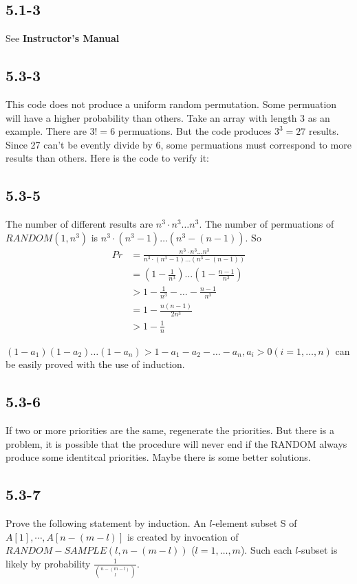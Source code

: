 \documentclass{book}
\begin{document}
\begin{CJK}{UTF8}{gkai}
\subsection*{5.1-3}
See \textbf{Instructor's Manual}

\subsection*{5.3-3}
This code does not produce a uniform random permutation. Some permuation will 
have a higher probability than others. Take an array with length 3 as an 
example. There are $3!=6$ permuations. But the code produces $3^3 = 27$ results.  
Since 27 can't be evently divide by 6, some permuations must correspond to more 
results than others. Here is the code to verify it:
%

\subsection*{5.3-5}
The number of different results are $n^3 \cdot n^3 \dots n^3$. The number of 
permuations of $RANDOM(1, n^3)$ is $n^3 \cdot (n^3-1) \dots (n^3-(n-1))$. So
\begin{align*}
Pr & = \frac{n^3 \cdot n^3 \dots n^3}{n^3 \cdot (n^3-1) \dots (n^3-(n-1))} \\
& = (1-\frac{1}{n^3}) \dots (1-\frac{n-1}{n^3}) \\
& > 1-\frac{1}{n^3}-\dots-\frac{n-1}{n^3} \\
& = 1-\frac{n(n-1)}{2n^3} \\
& > 1-\frac{1}{n}
\end{align*}

$(1-a_1)(1-a_2)\dots(1-a_n) > 1-a_1-a_2-\dots-a_n, a_i>0 (i=1,\dots,n)$ can be 
easily proved with the use of induction.

\subsection*{5.3-6}
If two or more priorities are the same, regenerate the priorities. But there is 
a problem, it is possible that the procedure will never end if the RANDOM always 
produce some identitcal priorities. Maybe there is some better solutions.

\subsection*{5.3-7}
Prove the following statement by induction. An $l$-element subset S of $A[1], 
\cdots, A[n-(m-l)]$ is created by invocation of $RANDOM-SAMPLE(l, n-(m-l))$ 
($l=1,\dots, m$). Such each $l$-subset is likely by probability 
$\frac{1}{\binom{n-(m-l)}{l}}$. 


\end{CJK}
\end{document}
